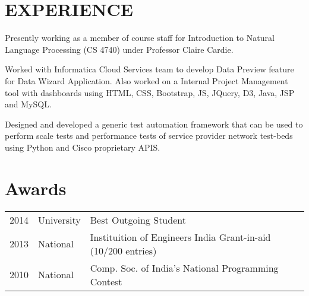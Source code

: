 \documentclass[]{deedy-resume-openfont}
\begin{document}
\begin{minipage}[t]{0.66\textwidth}

\section{EXPERIENCE}
Presently working as a member of course staff for Introduction to Natural Language Processing (CS 4740) under Professor Claire Cardie.
\sectionsep

Worked with Informatica Cloud Services team to develop Data Preview feature for Data Wizard Application. Also worked on a Internal Project Management tool with dashboards using HTML, CSS, Bootstrap, JS, JQuery, D3, Java, JSP and MySQL.
\sectionsep

Designed and developed a generic test automation framework that can be used to perform scale tests and performance tests of service provider network test-beds using Python and Cisco proprietary APIS.
\sectionsep


\section{Awards} 
\begin{tabular}{rll}
2014	     & University  & Best Outgoing Student\\
2013	     & National  & Instituition of Engineers India Grant-in-aid (10/200 entries)\\
2010     & National & Comp. Soc. of India's National Programming Contest\\
\end{tabular}
\sectionsep



\end{minipage} 
\end{document}
